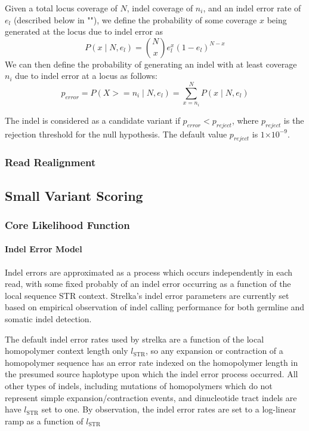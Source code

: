 \documentclass{article}
\newcommand{\e}[1]{\ensuremath{\times 10^{#1}}}
\begin{document}
Given a total locus coverage of $N$, indel coverage of $n_i$, and an indel error rate of $e_l$ (described below in ""), we define the probability of some coverage $x$ being generated at the locus due to indel error as
\begin{equation*}
P(x \mid N, e_l) = \binom {N} {x} e^{x}_l (1 - e_l)^{N - x}
\end{equation*}
We can then define the probability of generating an indel with at least coverage $n_i$ due to indel error at a locus as follows:
\begin{equation*}
p_{error} = P(X >= n_i \mid N, e_l) = \sum_{x = n_i}^{N} P(x \mid N, e_l)
\end{equation*}

\noindent The indel is considered as a candidate variant if $p_{error} < p_{reject}$, where $p_{reject}$ is the rejection threshold for the null hypothesis. The default value $p_{reject}$ is $1\e{-9}$.

\subsubsection{Read Realignment}

\subsection{Small Variant Scoring}

\subsubsection{Core Likelihood Function}

\paragraph{Indel Error Model}
\label{sec:indel_error}
Indel errors are approximated as a process which occurs independently in each read, with some fixed probably of an indel error occurring as a function of the local sequence STR context. Strelka's indel error parameters are currently set based on empirical observation of indel calling performance for both germline and somatic indel detection.

The default indel error rates used by strelka are a function of the local homopolymer context length only $l_{\text{STR}}$, so any expansion or contraction of a homopolymer sequence has an error rate indexed on the homopolymer length in the presumed source haplotype upon which the indel error process occurred. All other types of indels, including mutations of homopolymers which do not represent simple expansion/contraction events, and dinucleotide tract indels are have $l_{\text{STR}}$ set to one. By observation, the indel error rates are set to a log-linear ramp as a function of $l_{\text{STR}}$
\end{document}
